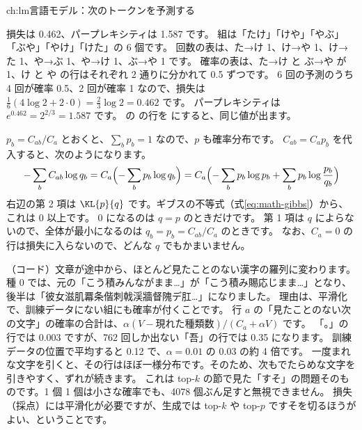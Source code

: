\begin{answers}{ch:lm}{言語モデル：次のトークンを予測する}
\item 損失は 0.462、パープレキシティは 1.587 です。
組は「たけ」「けや」「やぶ」「ぶや」「やけ」「けた」の 6 個です。
回数の表は、た→け 1、け→や 1、け→た 1、や→ぶ 1、や→け 1、ぶ→や 1 です。
確率の表は、た→け と ぶ→や が 1、け と や の行はそれぞれ 2 通りに分かれて 0.5 ずつです。
6 回の予測のうち 4 回が確率 0.5、2 回が確率 1 なので、損失は $\frac{1}{6}(4\log 2+2\cdot 0)=\frac{2}{3}\log 2=0.462$ です。
パープレキシティは $e^{0.462}=2^{2/3}=1.587$ です。
 の  の行を  にすると、同じ値が出ます。

\item $p_b=C_{ab}/C_a$ とおくと、$\sum_b p_b=1$ なので、$p$ も確率分布です。
$C_{ab}=C_a p_b$ を代入すると、次のようになります。
\[
-\sum_b C_{ab}\log q_b=C_a\Bigl(-\sum_b p_b\log q_b\Bigr)=C_a\Bigl(-\sum_b p_b\log p_b+\sum_b p_b\log\frac{p_b}{q_b}\Bigr)
\]
右辺の第 2 項は $\KL{p}{q}$ です。ギブスの不等式（式\eqref{eq:math-gibbs}）から、これは 0 以上です。
0 になるのは $q=p$ のときだけです。
第 1 項は $q$ によらないので、全体が最小になるのは $q_b=p_b=C_{ab}/C_a$ のときです。
なお、$C_a=0$ の行は損失に入らないので、どんな $q$ でもかまいません。

\item （コード）文章が途中から、ほとんど見たことのない漢字の羅列に変わります。
種 0 では、元の「こう積みんながまま\dots」が「こう積み賜応じまま\dots」となり、後半は「彼女滋肌羃条偕刺戟渓牆督隗デ肛\dots」になりました。
理由は、平滑化で、訓練データにない組にも確率が付くことです。
行 $a$ の「見たことのない次の文字」の確率の合計は、$\alpha(V-\text{現れた種類数})/(C_a+\alpha V)$ です。
「。」の行では 0.003 ですが、762 回しか出ない「吾」の行では 0.35 になります。
訓練データの位置で平均すると 0.12 で、$\alpha=0.01$ の 0.03 の約 4 倍です。
一度まれな文字を引くと、その行はほぼ一様分布です。そのため、次もでたらめな文字を引きやすく、ずれが続きます。
これは top-$k$ の節で見た「すそ」の問題そのものです。1 個 1 個は小さな確率でも、4078 個ぶん足すと無視できません。
損失（採点）には平滑化が必要ですが、生成では top-$k$ や top-$p$ ですそを切るほうがよい、ということです。


\end{answers}
